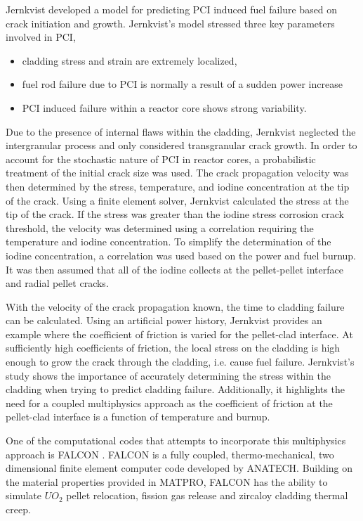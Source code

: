 \documentclass[edeposit,fullpage,11pt]{uiucthesis2009}
\begin{document}
Jernkvist \cite{jernkvist_model_1995} developed a model for predicting \gls{PCI} induced fuel failure based on crack initiation and growth.
Jernkvist's model stressed three key parameters involved in \gls{PCI},
\begin{itemize} 
\item cladding stress and strain are extremely localized, 
\item fuel rod failure due to \gls{PCI} is normally a result of a sudden power increase 
\item \gls{PCI} induced failure within a reactor core shows strong variability.
\end{itemize}
Due to the presence of internal flaws within the cladding, Jernkvist neglected the intergranular process and only considered transgranular crack growth.
In order to account for the stochastic nature of \gls{PCI} in reactor cores, a probabilistic treatment of the initial crack size was used.
The crack propagation velocity was then determined by the stress, temperature, and iodine concentration at the tip of the crack.
Using a finite element solver, Jernkvist calculated the stress at the tip of the crack.
If the stress was greater than the iodine stress corrosion crack threshold, the velocity was determined using a correlation requiring the temperature and iodine concentration.
To simplify the determination of the iodine concentration, a correlation was used based on the power and fuel burnup.
It was then assumed that all of the iodine collects at the pellet-pellet interface and radial pellet cracks.

With the velocity of the crack propagation known, the time to cladding failure can be calculated.
Using an artificial power history, Jernkvist provides an example where the coefficient of friction is varied for the pellet-clad interface.
At sufficiently high coefficients of friction, the local stress on the cladding is high enough to grow the crack through the cladding, i.e. cause fuel failure.
Jernkvist's study shows the importance of accurately determining the stress within the cladding when trying to predict cladding failure.
Additionally, it highlights the need for a coupled multiphysics approach as the coefficient of friction at the pellet-clad interface is a function of temperature and burnup.

One of the computational codes that attempts to incorporate this multiphysics approach is FALCON \cite{montgomery_falcon_1997}.
FALCON is a fully coupled, thermo-mechanical, two dimensional finite element computer code  developed by ANATECH.
Building on the material properties provided in MATPRO, FALCON has the ability to simulate $UO_2$ pellet relocation, fission gas release and zircaloy cladding thermal creep.
\end{document}
